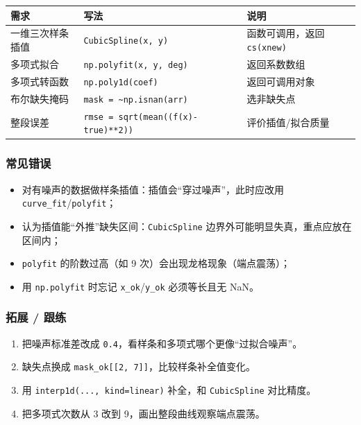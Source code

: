 {\def\LTcaptype{none} %
\begin{longtable}[]{@{}lll@{}}
\toprule\noalign{}
需求 & 写法 & 说明 \\
\midrule\noalign{}
\endhead
\bottomrule\noalign{}
\endlastfoot
一维三次样条插值 & \texttt{CubicSpline(x,\ y)} & 函数可调用，返回
\texttt{cs(xnew)} \\
多项式拟合 & \texttt{np.polyfit(x,\ y,\ deg)} & 返回系数数组 \\
多项式转函数 & \texttt{np.poly1d(coef)} & 返回可调用对象 \\
布尔缺失掩码 & \texttt{mask\ =\ \textasciitilde{}np.isnan(arr)} &
选非缺失点 \\
整段误差 & \texttt{rmse\ =\ sqrt(mean((f(x)-true)**2))} &
评价插值/拟合质量 \\
\end{longtable}
}

\subsubsection{常见错误}\label{ux5e38ux89c1ux9519ux8bef-16}

\begin{itemize}
\tightlist
\item
  对有噪声的数据做样条插值：插值会``穿过噪声''，此时应改用
  \texttt{curve\_fit}/\texttt{polyfit}；
\item
  认为插值能``外推''缺失区间：\texttt{CubicSpline}
  边界外可能明显失真，重点应放在区间内；
\item
  \texttt{polyfit} 的阶数过高（如 9 次）会出现龙格现象（端点震荡）；
\item
  用 \texttt{np.polyfit} 时忘记 \texttt{x\_ok}/\texttt{y\_ok}
  必须等长且无 NaN。
\end{itemize}

\subsubsection{拓展 / 跟练}\label{ux62d3ux5c55-ux8ddfux7ec3-5}

\begin{enumerate}
\def\labelenumi{\arabic{enumi}.}
\tightlist
\item
  把噪声标准差改成 \texttt{0.4}，看样条和多项式哪个更像``过拟合噪声''。
\item
  缺失点换成 \texttt{mask\_ok{[}{[}2,\ 7{]}{]}}，比较样条补全值变化。
\item
  用
  \texttt{interp1d(...,\ kind=\textquotesingle{}linear\textquotesingle{})}
  补全，和 \texttt{CubicSpline} 对比精度。
\item
  把多项式次数从 3 改到 9，画出整段曲线观察端点震荡。
\end{enumerate}

